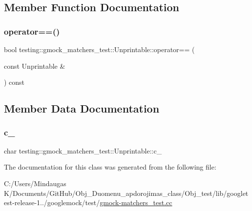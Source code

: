 \subsection{Member Function Documentation}
\mbox{\label{classtesting_1_1gmock__matchers__test_1_1_unprintable_ae09dc235a5341b07f0299bd24ee37e2d}} 
\subsubsection{\texorpdfstring{operator==()}{operator==()}}
{\footnotesize\ttfamily bool testing\+::gmock\+\_\+matchers\+\_\+test\+::\+Unprintable\+::operator== (\begin{DoxyParamCaption}\item[{const Unprintable \&}]{ }\end{DoxyParamCaption}) const\hspace{0.3cm}{\ttfamily [inline]}}



\subsection{Member Data Documentation}
\mbox{\label{classtesting_1_1gmock__matchers__test_1_1_unprintable_a4fb141b6b97e7bc6e046f94fce6dc1a8}} 
\subsubsection{\texorpdfstring{c\_}{c\_}}
{\footnotesize\ttfamily char testing\+::gmock\+\_\+matchers\+\_\+test\+::\+Unprintable\+::c\+\_\+\hspace{0.3cm}{\ttfamily [private]}}



The documentation for this class was generated from the following file\+:\begin{DoxyCompactItemize}
\item 
C\+:/\+Users/\+Mindaugas K/\+Documents/\+Git\+Hub/\+Obj\+\_\+\+Duomenu\+\_\+apdorojimas\+\_\+class/\+Obj\+\_\+test/lib/googletest-\/release-\/1../googlemock/test/\mbox{\hyperlink{_obj__test_2lib_2googletest-release-1_88_81_2googlemock_2test_2gmock-matchers__test_8cc}{gmock-\/matchers\+\_\+test.\+cc}}\end{DoxyCompactItemize}

